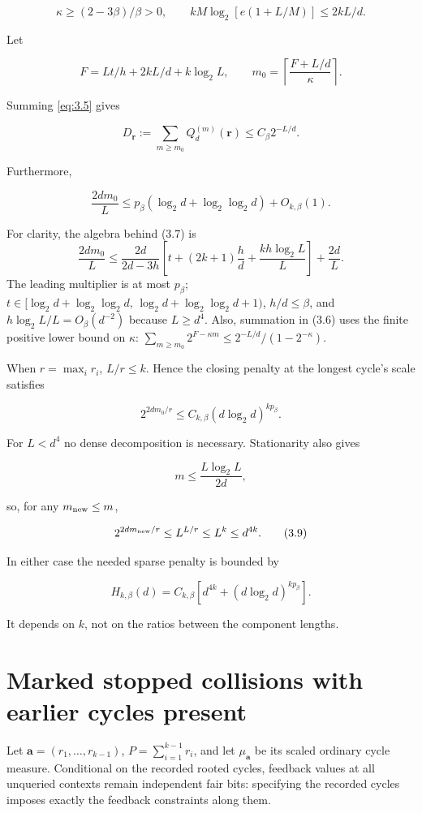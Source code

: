 \documentclass[11pt]{article}
\theoremstyle{remark}
\begin{document}
\[
 \kappa\ge(2-3\beta)/\beta>0,
 \qquad kM\log_2[e(1+L/M)]\le 2kL/d.
\]

Let

\[
 F=Lt/h+2kL/d+k\log_2L,\qquad
 m_0=\left\lceil\frac{F+L/d}{\kappa}\right\rceil.
\]

Summing \eqref{eq:3.5} gives

\[
 D_{\mathbf r}:=\sum_{m\ge m_0}Q_d^{(m)}(\mathbf r)
 \le C_\beta2^{-L/d}.
 \tag{3.6}\label{eq:3.6}
\]

Furthermore,

\[
 \frac{2dm_0}{L}
 \le p_\beta(\log_2d+\log_2\log_2d)+O_{k,\beta}(1).
 \tag{3.7}\label{eq:3.7}
\]

For clarity, the algebra behind (3.7) is \[
 \frac{2dm_0}{L}
 \le \frac{2d}{2d-3h}
 \left[t+(2k+1)\frac hd+\frac{kh\log_2L}{L}\right]
 +\frac{2d}{L}.
\] The leading multiplier is at most \(p_\beta\);
\(t\in[\log_2d+\log_2\log_2d,\,
\log_2d+\log_2\log_2d+1)\), \(h/d\le\beta\), and
\(h\log_2L/L=O_\beta(d^{-2})\) because \(L\ge d^4\). Also, summation in
(3.6) uses the finite positive lower bound on \(\kappa\):
\(\sum_{m\ge m_0}2^{F-\kappa m}\le
2^{-L/d}/(1-2^{-\kappa})\).

When \(r=\max_i r_i\), \(L/r\le k\). Hence the closing penalty at the
longest cycle's scale satisfies

\[
 2^{2dm_0/r}\le C_{k,\beta}(d\log_2d)^{kp_\beta}.
 \tag{3.8}\label{eq:3.8}
\]

For \(L<d^4\) no dense decomposition is necessary. Stationarity also
gives

\[
 m\le\frac{L\log_2L}{2d},
\]

so, for any \(m_{\rm new}\le m\),

\[
 2^{2dm_{\rm new}/r}\le L^{L/r}\le L^k\le d^{4k}.
 \tag{3.9}\label{eq:3.9}
\]

In either case the needed sparse penalty is bounded by

\[
 H_{k,\beta}(d)=C_{k,\beta}\left[d^{4k}+(d\log_2d)^{kp_\beta}\right].
 \tag{3.10}\label{eq:3.10}
\]

It depends on \(k\), not on the ratios between the component lengths.

\section{Marked stopped collisions with earlier cycles
present}\label{marked-stopped-collisions-with-earlier-cycles-present}

Let \(\mathbf a=(r_1,\ldots,r_{k-1})\), \(P=\sum_{i=1}^{k-1}r_i\), and let
\(\mu_{\mathbf a}\) be its scaled ordinary cycle measure. Conditional on
the recorded rooted cycles, feedback values at all unqueried contexts
remain independent fair bits: specifying the recorded cycles imposes
exactly the feedback constraints along them.
\end{document}
